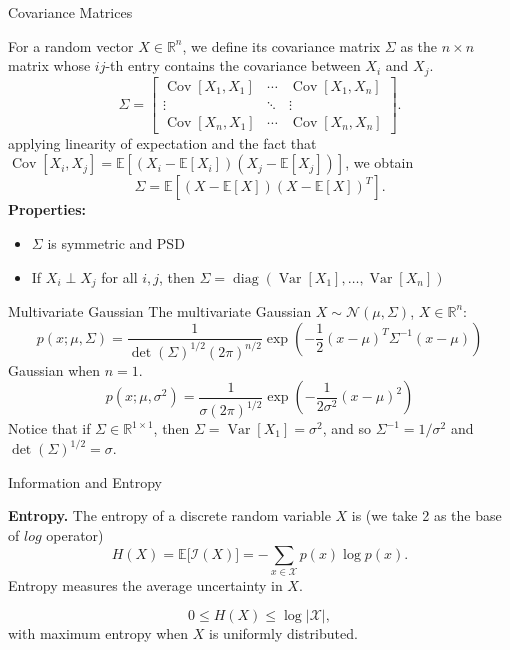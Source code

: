 \documentclass[aspectratio=169,12pt]{beamer}
\DeclareMathOperator{\diag}{diag}
\DeclareMathOperator{\Var}{Var}
\DeclareMathOperator{\Cov}{Cov}
\begin{document}
\begin{frame}[t]{Covariance Matrices}
  \vspace{-0.15cm}
  {\fontsize{8.8}{10.5}\selectfont
  For a random vector $X\in\mathbb{R}^{n}$, we define its covariance matrix
  $\Sigma$ as the $n\times n$ matrix whose $ij$-th entry contains the covariance
  between $X_i$ and $X_j$.
  \[
    \Sigma=
    \begin{bmatrix}
      \Cov[X_1,X_1]&\cdots&\Cov[X_1,X_n]\\
      \vdots&\ddots&\vdots\\
      \Cov[X_n,X_1]&\cdots&\Cov[X_n,X_n]
    \end{bmatrix}.
  \]
  applying linearity of expectation and the fact that
  $\Cov[X_i,X_j]=\mathbb{E}[(X_i-\mathbb{E}[X_i])(X_j-\mathbb{E}[X_j])]$, we
  obtain
  \[
    \Sigma=\mathbb{E}[(X-\mathbb{E}[X])(X-\mathbb{E}[X])^T].
  \]
  \textbf{Properties:}
  \begin{itemize}
    \setlength{\itemsep}{0.05cm}
    \item $\Sigma$ is symmetric and PSD
    \item If $X_i\perp X_j$ for all $i,j$, then
          $\Sigma=\diag(\Var[X_1],\ldots,\Var[X_n])$
  \end{itemize}
  }
\end{frame}



\begin{frame}[t]{Multivariate Gaussian}
  \vspace{0.1cm}
  {
  The multivariate Gaussian $X\sim\mathcal{N}(\mu,\Sigma)$, $X\in\mathbb{R}^{n}$:
  \[
    p(x;\mu,\Sigma)
    =\frac{1}{\det(\Sigma)^{1/2}(2\pi)^{n/2}}
      \exp\!\left(-\frac{1}{2}(x-\mu)^T\Sigma^{-1}(x-\mu)\right)
  \]
  Gaussian when $n=1$.
  \[
    p(x;\mu,\sigma^2)
    =\frac{1}{\sigma(2\pi)^{1/2}}
      \exp\!\left(-\frac{1}{2\sigma^2}(x-\mu)^2\right)
  \]
  Notice that if $\Sigma\in\mathbb{R}^{1\times1}$, then
  $\Sigma=\Var[X_1]=\sigma^2$, and so $\Sigma^{-1}=1/\sigma^2$ and
  $\det(\Sigma)^{1/2}=\sigma$.
  }
\end{frame}

\begin{frame}[t]{Information and Entropy}
	\vspace{0.2cm}
	
	
	
\textbf{Entropy.} 
		The entropy of a discrete random variable $X$ is (we take 2 as the base of $log$ operator)
		\[
		H(X)
		=
		\mathbb{E}\bigl[\mathcal{I}(X)\bigr]
		=
		-\sum_{x\in\mathcal{X}}p(x)\log p(x).
		\]
		Entropy measures the average uncertainty in $X$.

	

	
	\[
	0\leq H(X)\leq \log |\mathcal{X}|,
	\]
	with maximum entropy when $X$ is uniformly distributed.
\end{frame}
\end{document}
